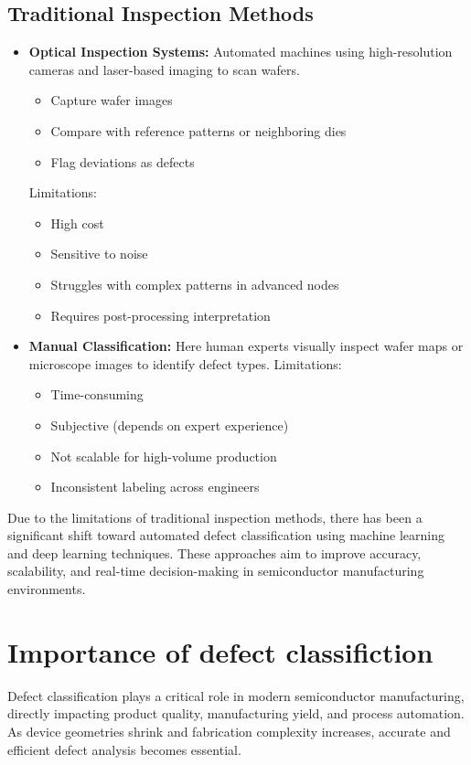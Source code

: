 \subsection{Traditional Inspection Methods}
\begin{itemize}
     \item \textbf{Optical Inspection Systems:}
     Automated machines using high-resolution cameras and laser-based imaging to scan wafers.
     \begin{itemize} How they work:
     \item Capture wafer images
     \item Compare with reference patterns or neighboring dies
     \item Flag deviations as defects
     \end{itemize}
      Limitations:
      \begin{itemize} 
      \item High cost
      \item Sensitive to noise
      \item Struggles with complex patterns in advanced nodes
      \item Requires post-processing interpretation
      \end{itemize}

     \item \textbf{Manual Classification:}  
       Here human experts visually inspect wafer maps or microscope images to identify defect types.
       Limitations:
       \begin{itemize} 
           \item Time-consuming
           \item Subjective (depends on expert experience)
            \item Not scalable for high-volume production
            \item Inconsistent labeling across engineers
       \end{itemize}
\end{itemize}
Due to the limitations of traditional inspection methods, there has been a significant shift toward automated defect classification using machine learning and deep learning techniques. These approaches aim to improve accuracy, scalability, and real-time decision-making in semiconductor manufacturing environments.

\section{Importance of defect classifiction}
Defect classification plays a critical role in modern semiconductor manufacturing, directly impacting product quality, manufacturing yield, and process automation. As device geometries shrink and fabrication complexity increases, accurate and efficient defect analysis becomes essential.

